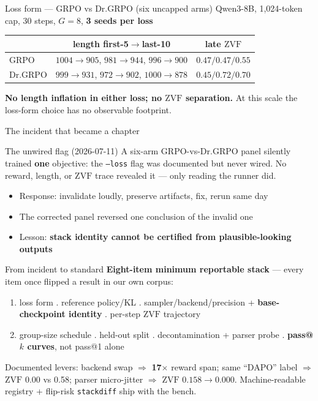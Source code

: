 \documentclass[11pt,aspectratio=169]{beamer}
\newcommand{\ZVF}{\ensuremath{\mathrm{ZVF}}}
\begin{document}
\begin{frame}{Loss form — GRPO vs Dr.GRPO (six uncapped arms)}
Qwen3-8B, 1{,}024-token cap, 30 steps, $G{=}8$, \textbf{3 seeds per loss}
\begin{center}
\small
\begin{tabular}{@{}lcc@{}}
\toprule
 & length first-5$\to$last-10 & late \ZVF{}\\
\midrule
GRPO & $1004{\to}905$,\; $981{\to}944$,\; $996{\to}900$ & $0.47/0.47/0.55$\\
Dr.GRPO & $999{\to}931$,\; $972{\to}902$,\; $1000{\to}878$ & $0.45/0.72/0.70$\\
\bottomrule
\end{tabular}
\end{center}
\medskip
\textbf{No length inflation in either loss; no \ZVF{} separation.}
At this scale the loss-form choice has no observable footprint.
\end{frame}

\begin{frame}{The incident that became a chapter}
\begin{block}{The unwired flag (2026-07-11)}
A six-arm GRPO-vs-Dr.GRPO panel silently trained \textbf{one} objective:
the \texttt{--loss} flag was documented but never wired. No reward, length,
or \ZVF{} trace revealed it — only reading the runner did.
\end{block}
\begin{itemize}
  \item Response: invalidate loudly, preserve artifacts, fix, rerun same day
  \item The corrected panel \alert{reversed} one conclusion of the invalid one
  \item Lesson: \textbf{stack identity cannot be certified from
        plausible-looking outputs}
\end{itemize}
\end{frame}

\begin{frame}{From incident to standard}
\textbf{Eight-item minimum reportable stack} — every item once flipped a
result in our own corpus:
\begin{enumerate}\small
  \item loss form . reference policy/KL . sampler/backend/precision
        + \textbf{base-checkpoint identity} . per-step \ZVF{} trajectory
  \setcounter{enumi}{4}
  \item group-size schedule . held-out split . decontamination +
        parser probe . \textbf{pass@$k$ curves}, not pass@1 alone
\end{enumerate}
\medskip
Documented levers: backend swap $\Rightarrow$ \textbf{17$\times$} reward span;
same ``DAPO'' label $\Rightarrow$ \ZVF{} 0.00 vs 0.58; parser micro-jitter
$\Rightarrow$ \ZVF{} $0.158\to0.000$. Machine-readable registry +
flip-risk \texttt{stackdiff} ship with the bench.
\end{frame}
\end{document}
